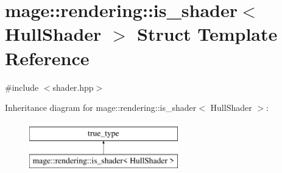 \hypertarget{structmage_1_1rendering_1_1is__shader_3_01_hull_shader_01_4}{}\section{mage\+:\+:rendering\+:\+:is\+\_\+shader$<$ Hull\+Shader $>$ Struct Template Reference}
\label{structmage_1_1rendering_1_1is__shader_3_01_hull_shader_01_4}


{\ttfamily \#include $<$shader.\+hpp$>$}

Inheritance diagram for mage\+:\+:rendering\+:\+:is\+\_\+shader$<$ Hull\+Shader $>$\+:\begin{figure}[H]
\begin{center}
\leavevmode
\includegraphics[height=2.000000cm]{structmage_1_1rendering_1_1is__shader_3_01_hull_shader_01_4}
\end{center}
\end{figure}
